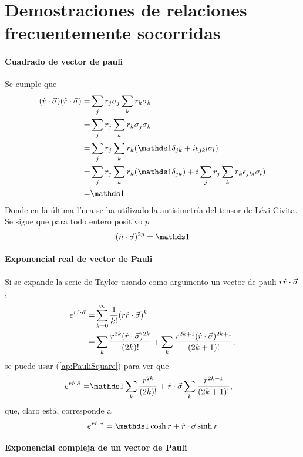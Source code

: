 \chapter{Demostraciones de relaciones frecuentemente socorridas}

\subsubsection{Cuadrado de vector de pauli}
Se cumple que
\begin{align*}
    (\paulivec{r})(\paulivec{r})=&\sum_{j}r_{j}\pauli{j}\sum_{k}r_{k}\pauli{k}\\
    =&\sum_{j}r_{j}\sum_{k}r_{k}\pauli{j}\pauli{k}\\
    =&\sum_{j}r_{j}\sum_{k}r_{k}(\Id\delta_{jk}+i\epsilon_{jkl}\pauli{l})\\
    =&\sum_{j}r_{j}\sum_{k}r_{k}(\Id\delta_{jk})+i\sum_{j}r_{j}\sum_{k}r_{k}\epsilon_{jkl}\pauli{l})\\
    =&\Id
\end{align*}
Donde en la última línea se ha utilizado la antisimetría del tensor de Lévi-Civita. Se sigue que para todo entero positivo $p$
\begin{equation}\label{ap:PauliSquare}
    (\paulivec{n})^{2p}=\Id
\end{equation}

\subsubsection{Exponencial real de vector de Pauli}
Si se expande la serie de Taylor usando como argumento un vector de pauli $r\hat{r}\cdot\vec{\sigma}$,
\begin{align*}
    e^{r\hat{r}\cdot\vec{\sigma}}=&\sum_{k=0}^{\infty}\frac{1}{k!}(r\hat{r}\cdot\vec{\sigma})^k\\
    =&\sum_{k}\frac{r^{2k}(\hat{r}\cdot\vec{\sigma})^{2k}}{(2k)!}+\sum_{k}\frac{r^{2k+1}(\hat{r}\cdot\vec{\sigma})^{2k+1}}{(2k+1)!},
\end{align*}
se puede usar (\ref{ap:PauliSquare}) para ver que
\begin{align*}
    e^{r\paulivec{r}}=&\Id\sum_{k}\frac{r^{2k}}{(2k)!}+\paulivec{r}\sum_{k}\frac{r^{2k+1}}{(2k+1)!},
\end{align*}
que, claro está, corresponde a
\begin{equation}\label{ap:PauliRealExp}
    e^{r\paulivec{r}}=\Id\cosh{r}+\paulivec{r}\sinh{r}
\end{equation}
\subsubsection{Exponencial compleja de un vector de Pauli}

